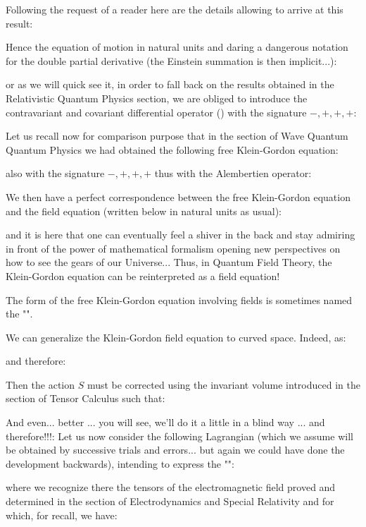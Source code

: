 	Following the request of a reader here are the details allowing to arrive at this result:
	
	Hence the equation of motion in natural units and daring a dangerous notation for the double partial derivative (the Einstein summation is then implicit...):
	
	or as we will quick see it, in order to fall back on the results obtained in the Relativistic Quantum Physics section, we are obliged to introduce the contravariant and covariant differential operator () with the signature $-, + , +, +$:
	
	Let us recall now for comparison purpose that in the section of Wave Quantum Quantum Physics we had obtained the following free Klein-Gordon equation:
	
	also with the signature $-, +, +, +$ thus with the Alembertien operator:
	
	We then have a perfect correspondence between the free Klein-Gordon equation and the field equation (written below in natural units as usual):
	
	and it is here that one can eventually feel a shiver in the back and stay admiring in front of the power of mathematical formalism opening new perspectives on how to see the gears of our Universe... Thus, in Quantum Field Theory, the Klein-Gordon equation can be reinterpreted as a field equation! 

	The form of the free Klein-Gordon equation involving fields is sometimes named the "".
	\begin{tcolorbox}[title=Remark,colframe=black,arc=10pt]
	We can generalize the Klein-Gordon field equation to curved space. Indeed, as:
	
	and therefore:
	
	Then the action $S$ must be corrected using the invariant volume introduced in the section of Tensor Calculus such that:
	
	\end{tcolorbox}
	And even... better ... you will see, we'll do it a little in a blind way ... and therefore!!!: Let us now consider the following Lagrangian (which we assume will be obtained by successive trials and errors... but again we could have done the development backwards), intending to express the "":
	
	where we recognize there the tensors of the electromagnetic field proved and determined in the section of Electrodynamics and Special Relativity and for which, for recall, we have:
	
